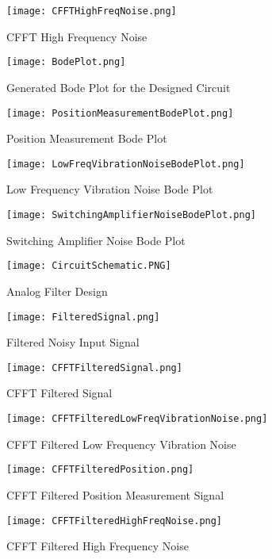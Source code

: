 \documentclass[12pt]{report}
\begin{document}
\begin{figure}
\texttt{[image: CFFTHighFreqNoise.png]}
\caption{CFFT High Frequency Noise}
\end{figure}

\begin{figure}
\texttt{[image: BodePlot.png]}
\caption{Generated Bode Plot for the Designed Circuit}
\end{figure}

\begin{figure}
\texttt{[image: PositionMeasurementBodePlot.png]}
\caption{Position Measurement Bode Plot}
\end{figure}

\begin{figure}
\texttt{[image: LowFreqVibrationNoiseBodePlot.png]}
\caption{Low Frequency Vibration Noise Bode Plot}
\end{figure}

\begin{figure}
\texttt{[image: SwitchingAmplifierNoiseBodePlot.png]}
\caption{Switching Amplifier Noise Bode Plot}
\end{figure}

\begin{figure}
\texttt{[image: CircuitSchematic.PNG]}
\caption{Analog Filter Design}
\end{figure}

\begin{figure}
\texttt{[image: FilteredSignal.png]}
\caption{Filtered Noisy Input Signal}
\end{figure}

\begin{figure}
\texttt{[image: CFFTFilteredSignal.png]}
\caption{CFFT Filtered Signal}
\end{figure}

\begin{figure}
\texttt{[image: CFFTFilteredLowFreqVibrationNoise.png]}
\caption{CFFT Filtered Low Frequency Vibration Noise}
\end{figure}

\begin{figure}
\texttt{[image: CFFTFilteredPosition.png]}
\caption{CFFT Filtered Position Measurement Signal}
\end{figure}

\begin{figure}
\texttt{[image: CFFTFilteredHighFreqNoise.png]}
\caption{CFFT Filtered High Frequency Noise}
\end{figure}
\end{document}
